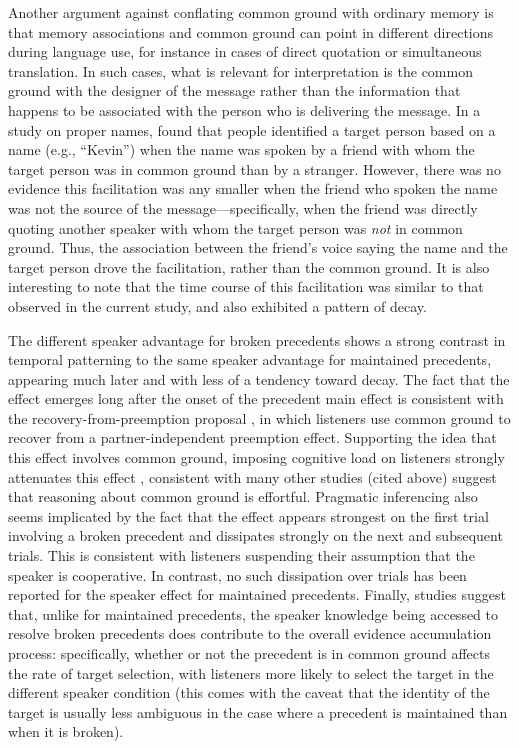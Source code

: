 \documentclass[doc,fignum,apacite,floatsintext]{apa6}
\begin{document}
Another argument against conflating common ground with ordinary memory is that memory associations and common ground can point in different directions during language use, for instance in cases of direct quotation or simultaneous translation.  In such cases, what is relevant for interpretation is the common ground with the designer of the message rather than the information that happens to be associated with the person who is delivering the message.  In a study on proper names, \cite{BarrJacksonPhillips2014} found that people identified a target person based on a name (e.g., ``Kevin'') when the name was spoken by a friend with whom the target person was in common ground than by a stranger.  However, there was no evidence this facilitation was any smaller when the friend who spoken the name was not the source of the message---specifically, when the friend was directly quoting another speaker with whom the target person was \textit{not} in common ground.  Thus, the association between the friend's voice saying the name and the target person drove the facilitation, rather than the common ground.  It is also interesting to note that the time course of this facilitation was similar to that observed in the current study, and also exhibited a pattern of decay.

The different speaker advantage for broken precedents shows a strong contrast in temporal patterning to the same speaker advantage for maintained precedents, appearing much later and with less of a tendency toward decay.  The fact that the effect emerges long after the onset of the precedent main effect is consistent with the recovery-from-preemption proposal \cite{kronmullerbarr07}, in which listeners use common ground to recover from a partner-independent preemption effect.  Supporting the idea that this effect involves common ground, imposing cognitive load on listeners strongly attenuates this effect \cite{kronmullerbarr07}, consistent with many other studies (cited above) suggest that reasoning about common ground is effortful.  Pragmatic inferencing also seems implicated by the fact that the effect appears strongest on the first trial involving a broken precedent \cite{brennanhanna09,MatthewsLievenTomasello2012} and dissipates strongly on the next and subsequent trials.  This is consistent with listeners suspending their assumption that the speaker is cooperative.  In contrast, no such dissipation over trials has been reported for the speaker effect for maintained precedents.  Finally, studies suggest that, unlike for maintained precedents, the speaker knowledge being accessed to resolve broken precedents does contribute to the overall evidence accumulation process: specifically, whether or not the precedent is in common ground affects the rate of target selection, with listeners more likely to select the target in the different speaker condition \cite{kronmullerbarr07} (this comes with the caveat that the identity of the target is usually less ambiguous in the case where a precedent is maintained than when it is broken).
\end{document}
